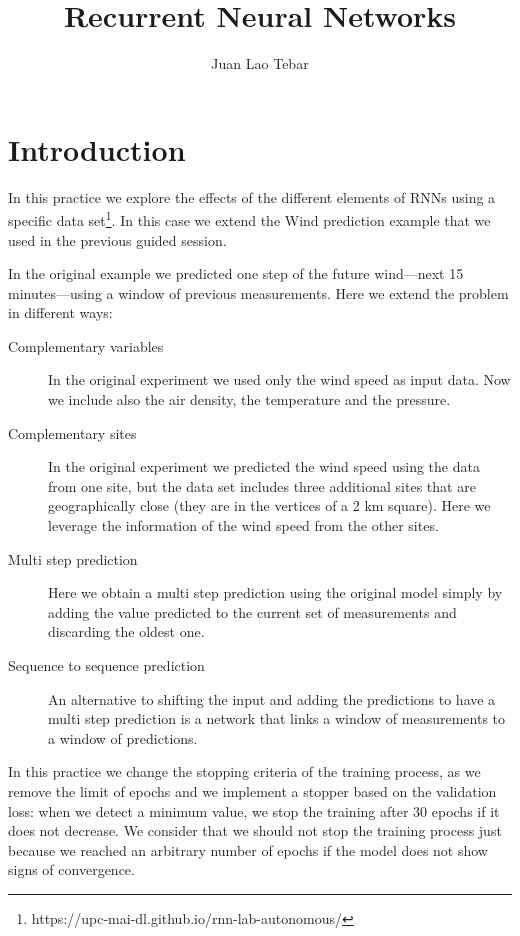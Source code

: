 \documentclass[]{article}
\title{Recurrent Neural Networks}
\author{Juan Lao Tebar}
\begin{document}
	
	\maketitle
	
	\section{Introduction} 

	In this practice we explore the effects of the different elements of RNNs using a specific data set\footnote{https://upc-mai-dl.github.io/rnn-lab-autonomous/}. In this case we extend the Wind prediction example that we used in the previous guided session.
	
	In the original example we predicted one step of the future wind---next 15 minutes---using a window of previous measurements. Here we extend the problem in different ways:
	
	\begin{description}
		\item [Complementary variables] In the original experiment we used only the wind speed as input data. Now we include also the air density, the temperature and the pressure.
		
		\item [Complementary sites] In the original experiment we predicted the wind speed using the data from one site, but the data set includes three additional sites that are geographically close (they are in the vertices of a 2 km square). Here we leverage the information of the wind speed from the other sites.
		
		\item [Multi step prediction] Here we obtain a multi step prediction using the original model simply by adding the value predicted to the current set of measurements and discarding the oldest one.
		
		\item [Sequence to sequence prediction] An alternative to shifting the input and adding the predictions to have a multi step prediction is a network that links a window of measurements to a window of predictions.
	\end{description}
	
	In this practice we change the stopping criteria of the training process, as we remove the limit of epochs and we implement a stopper based on the validation loss: when we detect a minimum value, we stop the training after 30 epochs if it does not decrease. We consider that we should not stop the training process just because we reached an arbitrary number of epochs if the model does not show signs of convergence.
	
\end{document}
